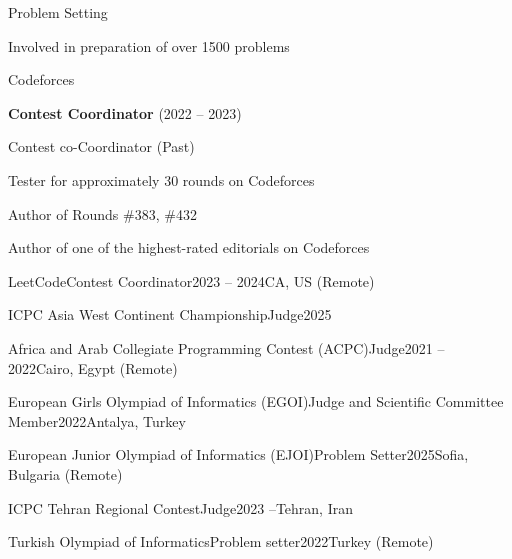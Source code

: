 
\begin{section}{Problem Setting}

  \item Involved in preparation of over 1500 problems
  
  \begin{subsection}{Codeforces}{}{}{}
    \item \textbf{Contest Coordinator} (2022 – 2023)
    \item Contest co-Coordinator (Past)
    \item Tester for approximately 30 rounds on Codeforces
    \item Author of Rounds \#383, \#432
    \item Author of one of the highest-rated editorials on Codeforces
  \end{subsection}

  \begin{subsection}{LeetCode}{Contest Coordinator}{2023 -- 2024}{CA, US (Remote)}
  \end{subsection}

  \begin{subsection}{ICPC Asia West Continent Championship}{Judge}{2025}{}
  \end{subsection}

  \begin{subsection}{Africa and Arab Collegiate Programming Contest (ACPC)}{Judge}{2021 – 2022}{Cairo, Egypt (Remote)}
  \end{subsection}

  \begin{subsection}{European Girls Olympiad of Informatics (EGOI)}{Judge and Scientific Committee Member}{2022}{Antalya, Turkey}
  \end{subsection}

  \begin{subsection}{European Junior Olympiad of Informatics (EJOI)}{Problem Setter}{2025}{Sofia, Bulgaria (Remote)}
  \end{subsection}


  \begin{subsection}{ICPC Tehran Regional Contest}{Judge}{2023 –}{Tehran, Iran}
  \end{subsection}


  \begin{subsection}{Turkish Olympiad of Informatics}{Problem setter}{2022}{Turkey (Remote)}
  \end{subsection}


\end{section}
